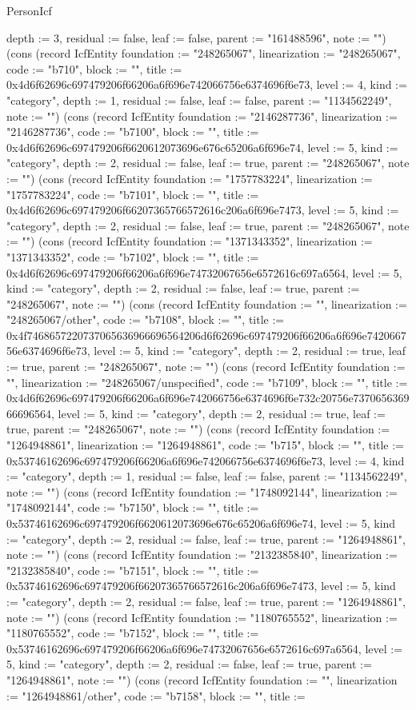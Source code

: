 \begin{lexlean}{PersonIcf}
\begin{semanticmodule}
{depth := 3, residual := false, leaf := false, parent := "161488596", note := ""}) (cons (record IcfEntity {foundation := "248265067", linearization := "248265067", code := "b710", block := "", title := 0x4d6f62696c697479206f66206a6f696e742066756e6374696f6e73, level := 4, kind := "category", depth := 1, residual := false, leaf := false, parent := "1134562249", note := ""}) (cons (record IcfEntity {foundation := "2146287736", linearization := "2146287736", code := "b7100", block := "", title := 0x4d6f62696c697479206f6620612073696e676c65206a6f696e74, level := 5, kind := "category", depth := 2, residual := false, leaf := true, parent := "248265067", note := ""}) (cons (record IcfEntity {foundation := "1757783224", linearization := "1757783224", code := "b7101", block := "", title := 0x4d6f62696c697479206f66207365766572616c206a6f696e7473, level := 5, kind := "category", depth := 2, residual := false, leaf := true, parent := "248265067", note := ""}) (cons (record IcfEntity {foundation := "1371343352", linearization := "1371343352", code := "b7102", block := "", title := 0x4d6f62696c697479206f66206a6f696e74732067656e6572616c697a6564, level := 5, kind := "category", depth := 2, residual := false, leaf := true, parent := "248265067", note := ""}) (cons (record IcfEntity {foundation := "", linearization := "248265067/other", code := "b7108", block := "", title := 0x4f7468657220737065636966696564206d6f62696c697479206f66206a6f696e742066756e6374696f6e73, level := 5, kind := "category", depth := 2, residual := true, leaf := true, parent := "248265067", note := ""}) (cons (record IcfEntity {foundation := "", linearization := "248265067/unspecified", code := "b7109", block := "", title := 0x4d6f62696c697479206f66206a6f696e742066756e6374696f6e732c20756e737065636966696564, level := 5, kind := "category", depth := 2, residual := true, leaf := true, parent := "248265067", note := ""}) (cons (record IcfEntity {foundation := "1264948861", linearization := "1264948861", code := "b715", block := "", title := 0x53746162696c697479206f66206a6f696e742066756e6374696f6e73, level := 4, kind := "category", depth := 1, residual := false, leaf := false, parent := "1134562249", note := ""}) (cons (record IcfEntity {foundation := "1748092144", linearization := "1748092144", code := "b7150", block := "", title := 0x53746162696c697479206f6620612073696e676c65206a6f696e74, level := 5, kind := "category", depth := 2, residual := false, leaf := true, parent := "1264948861", note := ""}) (cons (record IcfEntity {foundation := "2132385840", linearization := "2132385840", code := "b7151", block := "", title := 0x53746162696c697479206f66207365766572616c206a6f696e7473, level := 5, kind := "category", depth := 2, residual := false, leaf := true, parent := "1264948861", note := ""}) (cons (record IcfEntity {foundation := "1180765552", linearization := "1180765552", code := "b7152", block := "", title := 0x53746162696c697479206f66206a6f696e74732067656e6572616c697a6564, level := 5, kind := "category", depth := 2, residual := false, leaf := true, parent := "1264948861", note := ""}) (cons (record IcfEntity {foundation := "", linearization := "1264948861/other", code := "b7158", block := "", title := }
\end{semanticmodule}
\end{lexlean}
